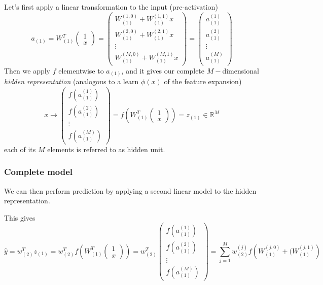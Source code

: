 Let's first apply a linear transformation to the input (pre-activation) \[
  a_{(1)} = W_{(1)}^T \begin{pmatrix}
     1  \\
     x 
  \end{pmatrix} = \begin{pmatrix}
  W_{(1)}^{(1,0)} + W_{(1)}^{(1,1)}x   \\
  W_{(1)}^{(2,0)} + W_{(1)}^{(2,1)}x \\
  \vdots  \\
W_{(1)}^{(M,0)} + W_{(1)}^{(M,1)}x

  \end{pmatrix} = \begin{pmatrix}
  a_{(1)}^{(1)}  \\
  a_{(1)}^{(2)} \\
  \vdots  \\
a_{(1)}^{(M)}
  \end{pmatrix}
\]
Then we apply $f$ elementwise to $a_{(1)}$, and it gives our complete $M-$dimensional \textit{hidden representation} (analogous to a learn $\phi(x)$ of the feature expansion)\[
  x \to \begin{pmatrix}
    f(a_{(1)}^{(1)})   \\
  f(a_{(1)}^{(2)}) \\
    \vdots \\
    f(a_{(1)}^{(M)})
\end{pmatrix} = f \left(W_{(1)}^T \begin{pmatrix}
  1  \\
  x 
\end{pmatrix}\right) = z_{(1)} \in \mathbb{R}^M
\]
each of its $M$ elements is referred to as hidden unit.
\subsubsection{Complete model}
We can then perform prediction by applying a second linear
model to the hidden representation. 

This gives \[
  \hat{y} = w_{(2)}^T z_{(1)} = w_{(2)}^T f \left(W_{(1)}^T \begin{pmatrix}
    1  \\
    x 
\end{pmatrix}\right) = w_{(2)}^T \begin{pmatrix}
    f(a_{(1)}^{(1)})   \\
    f(a_{(1)}^{(2)}) \\
    \vdots \\
    f(a_{(1)}^{(M)})
\end{pmatrix}
= \sum_{j=1}^{M} w_{(2)}^{(j)} f \left(W_{(1)}^{(j,0)} + (W_{(1)}^{(j,1)}\right)
\]

